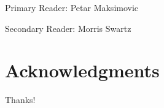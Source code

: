 \documentclass[12pt]{report}
\begin{document}
\vspace{15mm}

\noindent Primary Reader: Petar Maksimovic

\noindent Secondary Reader: Morris Swartz

\chapter*{Acknowledgments}
Thanks!
%
%

\pagestyle{plain}
\tableofcontents
\listoftables
\listoffigures

\cleardoublepage %


%
%




%

 


%
%




%
\end{document}
